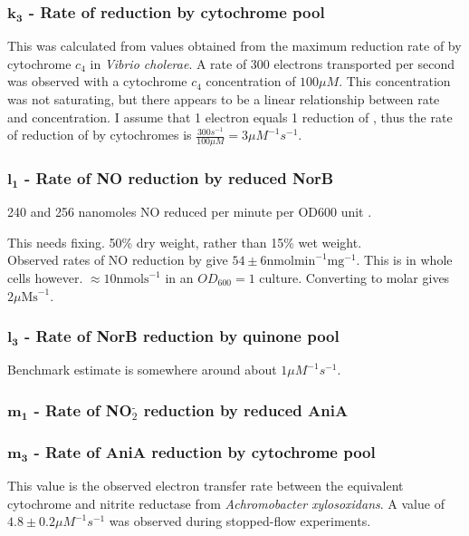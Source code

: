 \subsubsection*{$\mathbf{k_3}$ {\bf- Rate of \cbbthree{} reduction by cytochrome pool}}
This was calculated from values obtained from the maximum reduction rate of \cbbthree{} by cytochrome $c_4$ in \textit{Vibrio cholerae}\cite{Chang2010}. A rate of 300 electrons transported per second was observed with a cytochrome $c_4$ concentration of $100\mu M$. This concentration was not saturating, but there appears to be a linear relationship between rate and concentration. I assume that 1 electron equals 1 reduction of \cbbthree{}, thus the rate of reduction of \cbbthree{} by cytochromes is $\frac{300s^{-1}}{100\mu M} = 3\mu M^{-1} s^{-1}$.

\subsubsection*{$\mathbf{l_1}$ {\bf- Rate of NO reduction by reduced NorB}}
240 and 256 nanomoles NO reduced per minute per OD600 unit \citet{Barth2009}.

This needs fixing. 50\% dry weight, rather than 15\% wet weight.\\
Observed rates of NO reduction by \citet{Rock2007} give $54 \pm 6 \mathrm{nmol min}^{-1} \mathrm{mg}^{-1}$. This is in whole cells however.
$\approx 10\mathrm{nmol s}^{-1}$ in an $OD_{600} = 1$ culture. Converting to molar gives $2\mu\mathrm{M s}^{-1}$. 

\subsubsection*{$\mathbf{l_3}$ {\bf- Rate of NorB reduction by quinone pool}}
Benchmark estimate is somewhere around about $1\mu M^{-1}s^{-1}$.

\subsubsection*{$\mathbf{m_1}$ {\bf- Rate of NO$_{\textrm{2}}^{\textrm{-}}$ reduction by reduced AniA}}


\subsubsection*{$\mathbf{m_3}$ {\bf- Rate of AniA reduction by cytochrome pool}}
This value is the observed electron transfer rate between the equivalent cytochrome and nitrite reductase from \textit{Achromobacter xylosoxidans}. A value of $4.8\pm0.2 \mu M^{-1}s^{-1}$ was observed during stopped-flow experiments\cite{Nojiri2009}.

